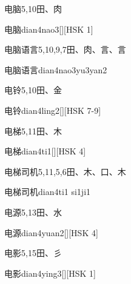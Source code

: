 \begin{Entry}{电脑}{5,10}{⽥、⾁}
  \begin{Phonetics}{电脑}{dian4nao3}[][HSK 1]
  \end{Phonetics}
\end{Entry}

\begin{Entry}{电脑语言}{5,10,9,7}{⽥、⾁、⾔、⾔}
  \begin{Phonetics}{电脑语言}{dian4nao3yu3yan2}
  \end{Phonetics}
\end{Entry}

\begin{Entry}{电铃}{5,10}{⽥、⾦}
  \begin{Phonetics}{电铃}{dian4ling2}[][HSK 7-9]
  \end{Phonetics}
\end{Entry}

\begin{Entry}{电梯}{5,11}{⽥、⽊}
  \begin{Phonetics}{电梯}{dian4ti1}[][HSK 4]
  \end{Phonetics}
\end{Entry}

\begin{Entry}{电梯司机}{5,11,5,6}{⽥、⽊、⼝、⽊}
  \begin{Phonetics}{电梯司机}{dian4ti1 si1ji1}
  \end{Phonetics}
\end{Entry}

\begin{Entry}{电源}{5,13}{⽥、⽔}
  \begin{Phonetics}{电源}{dian4yuan2}[][HSK 4]
  \end{Phonetics}
\end{Entry}

\begin{Entry}{电影}{5,15}{⽥、⼺}
  \begin{Phonetics}{电影}{dian4ying3}[][HSK 1]
  \end{Phonetics}
\end{Entry}

